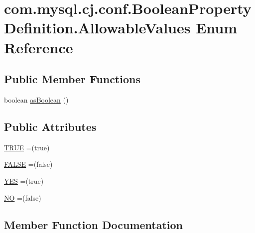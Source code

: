 \hypertarget{enumcom_1_1mysql_1_1cj_1_1conf_1_1_boolean_property_definition_1_1_allowable_values}{}\section{com.\+mysql.\+cj.\+conf.\+Boolean\+Property\+Definition.\+Allowable\+Values Enum Reference}
\label{enumcom_1_1mysql_1_1cj_1_1conf_1_1_boolean_property_definition_1_1_allowable_values}
\subsection*{Public Member Functions}
\begin{DoxyCompactItemize}
\item 
boolean \mbox{\hyperlink{enumcom_1_1mysql_1_1cj_1_1conf_1_1_boolean_property_definition_1_1_allowable_values_adf587e39383a8e4c2a45de69aeabb887}{as\+Boolean}} ()
\end{DoxyCompactItemize}
\subsection*{Public Attributes}
\begin{DoxyCompactItemize}
\item 
\mbox{\hyperlink{enumcom_1_1mysql_1_1cj_1_1conf_1_1_boolean_property_definition_1_1_allowable_values_a3094d517bb204b73156e4081b512785f}{T\+R\+UE}} =(true)
\item 
\mbox{\hyperlink{enumcom_1_1mysql_1_1cj_1_1conf_1_1_boolean_property_definition_1_1_allowable_values_af39e7cb5c0ef3b1f233b06911e42035c}{F\+A\+L\+SE}} =(false)
\item 
\mbox{\hyperlink{enumcom_1_1mysql_1_1cj_1_1conf_1_1_boolean_property_definition_1_1_allowable_values_ae25e992a50ad9227f2a65289b477cd5a}{Y\+ES}} =(true)
\item 
\mbox{\hyperlink{enumcom_1_1mysql_1_1cj_1_1conf_1_1_boolean_property_definition_1_1_allowable_values_a6fbd99656bca34e8d4dee3760653e546}{NO}} =(false)
\end{DoxyCompactItemize}


\subsection{Member Function Documentation}
\mbox{\label{enumcom_1_1mysql_1_1cj_1_1conf_1_1_boolean_property_definition_1_1_allowable_values_adf587e39383a8e4c2a45de69aeabb887}} 
